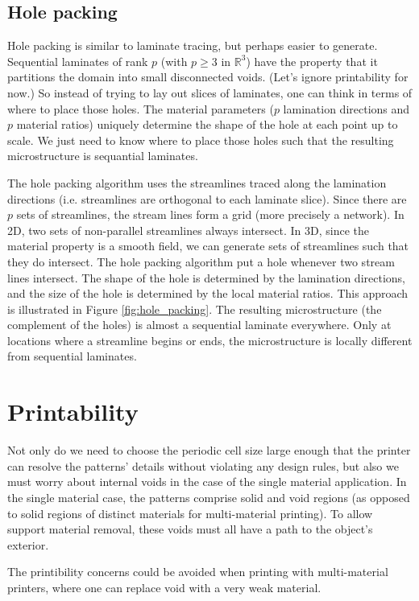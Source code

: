 \documentclass[10pt]{article}
\begin{document}
\subsection{Hole packing}
Hole packing is similar to laminate tracing, but perhaps easier to generate.  Sequential
laminates of rank $p$ (with $p\ge3$ in $\mathbb{R}^3$) have the property that it
partitions the domain into small disconnected voids.  (Let's ignore printability
for now.)  So instead of trying to lay out slices of laminates, one can
think in terms of where to place those holes.  The material parameters ($p$
lamination directions and $p$ material ratios) uniquely determine the shape of
the hole at each point up to scale.   We just need to know where to place those
holes such that the resulting microstructure is sequantial laminates.

The hole packing algorithm uses the streamlines traced along the lamination
directions (i.e. streamlines are orthogonal to each laminate slice).  Since
there are $p$ sets of streamlines, the stream lines form a grid (more precisely
a network).  In 2D, two
sets of non-parallel streamlines always intersect.  In 3D, since the material
property is a smooth field, we can generate sets of streamlines such that they
do intersect.  The hole packing algorithm put a hole whenever two stream
lines intersect. The shape of the hole is determined by the lamination
directions, and the size of the hole is determined by the local material ratios.
This approach is illustrated in Figure \ref{fig:hole_packing}.  The resulting
microstructure (the complement of the holes) is almost a sequential laminate
everywhere.  Only at locations where a streamline begins or ends, the
microstructure is locally different from sequential laminates.


\section{Printability}
Not only do we need to choose the periodic cell size large enough that the
printer can resolve the patterns' details without violating any design rules,
but also we must worry about internal voids in the case of the single material
application. In the single material case, the patterns comprise solid and void
regions (as opposed to solid regions of distinct materials for multi-material
printing). To allow support material removal, these voids must all have a path
to the object's exterior.

The printibility concerns could be avoided when printing with multi-material
printers, where one can replace void with a very weak material.
\end{document}
